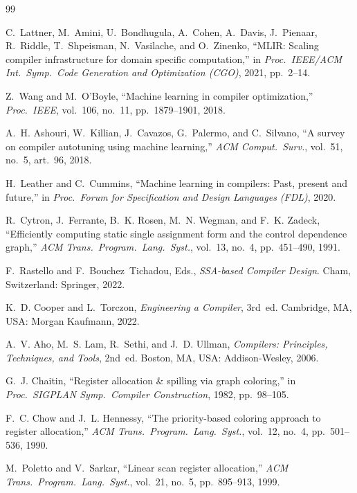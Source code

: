 \documentclass[conference]{IEEEtran}
\begin{document}
\begin{thebibliography}{99}
\footnotesize

C.~Lattner, M.~Amini, U.~Bondhugula, A.~Cohen, A.~Davis, J.~Pienaar,
R.~Riddle, T.~Shpeisman, N.~Vasilache, and O.~Zinenko, ``MLIR: Scaling
compiler infrastructure for domain specific computation,'' in
\emph{Proc.\ IEEE/ACM Int.\ Symp.\ Code Generation and Optimization
(CGO)}, 2021, pp.~2--14.

Z.~Wang and M.~O'Boyle, ``Machine learning in compiler optimization,''
\emph{Proc.\ IEEE}, vol.~106, no.~11, pp.~1879--1901, 2018.

A.~H. Ashouri, W.~Killian, J.~Cavazos, G.~Palermo, and C.~Silvano, ``A
survey on compiler autotuning using machine learning,'' \emph{ACM
Comput.\ Surv.}, vol.~51, no.~5, art.~96, 2018.

H.~Leather and C.~Cummins, ``Machine learning in compilers: Past,
present and future,'' in \emph{Proc.\ Forum for Specification and
Design Languages (FDL)}, 2020.

R.~Cytron, J.~Ferrante, B.~K. Rosen, M.~N. Wegman, and F.~K. Zadeck,
``Efficiently computing static single assignment form and the control
dependence graph,'' \emph{ACM Trans.\ Program.\ Lang.\ Syst.}, vol.~13,
no.~4, pp.~451--490, 1991.

F.~Rastello and F.~Bouchez~Tichadou, Eds., \emph{SSA-based Compiler
Design}. Cham, Switzerland: Springer, 2022.

K.~D. Cooper and L.~Torczon, \emph{Engineering a Compiler}, 3rd~ed.
Cambridge, MA, USA: Morgan Kaufmann, 2022.

A.~V. Aho, M.~S. Lam, R.~Sethi, and J.~D. Ullman, \emph{Compilers:
Principles, Techniques, and Tools}, 2nd~ed. Boston, MA, USA:
Addison-Wesley, 2006.

G.~J. Chaitin, ``Register allocation \& spilling via graph coloring,''
in \emph{Proc.\ SIGPLAN Symp.\ Compiler Construction}, 1982,
pp.~98--105.

F.~C. Chow and J.~L. Hennessy, ``The priority-based coloring approach
to register allocation,'' \emph{ACM Trans.\ Program.\ Lang.\ Syst.},
vol.~12, no.~4, pp.~501--536, 1990.

M.~Poletto and V.~Sarkar, ``Linear scan register allocation,''
\emph{ACM Trans.\ Program.\ Lang.\ Syst.}, vol.~21, no.~5,
pp.~895--913, 1999.


\end{thebibliography}
\end{document}
